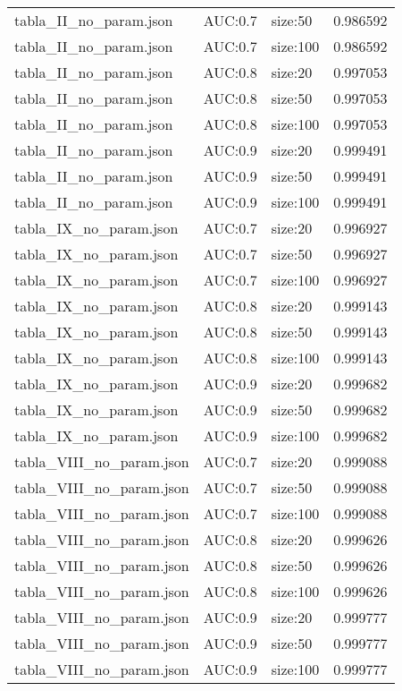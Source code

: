 \begin{tabular}{lllr}
tabla_II_no_param.json & AUC:0.7 & size:50 & 0.986592 \\
tabla_II_no_param.json & AUC:0.7 & size:100 & 0.986592 \\
tabla_II_no_param.json & AUC:0.8 & size:20 & 0.997053 \\
tabla_II_no_param.json & AUC:0.8 & size:50 & 0.997053 \\
tabla_II_no_param.json & AUC:0.8 & size:100 & 0.997053 \\
tabla_II_no_param.json & AUC:0.9 & size:20 & 0.999491 \\
tabla_II_no_param.json & AUC:0.9 & size:50 & 0.999491 \\
tabla_II_no_param.json & AUC:0.9 & size:100 & 0.999491 \\
tabla_IX_no_param.json & AUC:0.7 & size:20 & 0.996927 \\
tabla_IX_no_param.json & AUC:0.7 & size:50 & 0.996927 \\
tabla_IX_no_param.json & AUC:0.7 & size:100 & 0.996927 \\
tabla_IX_no_param.json & AUC:0.8 & size:20 & 0.999143 \\
tabla_IX_no_param.json & AUC:0.8 & size:50 & 0.999143 \\
tabla_IX_no_param.json & AUC:0.8 & size:100 & 0.999143 \\
tabla_IX_no_param.json & AUC:0.9 & size:20 & 0.999682 \\
tabla_IX_no_param.json & AUC:0.9 & size:50 & 0.999682 \\
tabla_IX_no_param.json & AUC:0.9 & size:100 & 0.999682 \\
tabla_VIII_no_param.json & AUC:0.7 & size:20 & 0.999088 \\
tabla_VIII_no_param.json & AUC:0.7 & size:50 & 0.999088 \\
tabla_VIII_no_param.json & AUC:0.7 & size:100 & 0.999088 \\
tabla_VIII_no_param.json & AUC:0.8 & size:20 & 0.999626 \\
tabla_VIII_no_param.json & AUC:0.8 & size:50 & 0.999626 \\
tabla_VIII_no_param.json & AUC:0.8 & size:100 & 0.999626 \\
tabla_VIII_no_param.json & AUC:0.9 & size:20 & 0.999777 \\
tabla_VIII_no_param.json & AUC:0.9 & size:50 & 0.999777 \\
tabla_VIII_no_param.json & AUC:0.9 & size:100 & 0.999777 \\
\bottomrule
\end{tabular}
